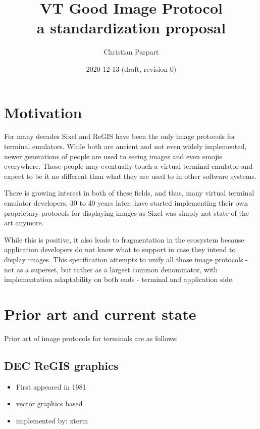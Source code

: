 \documentclass{article}
\title{VT Good Image Protocol \\
a standardization proposal}
\author{Christian Parpart}
\date{2020-12-13 (draft, revision 0)}
\begin{document}
\maketitle

\tableofcontents


\section{Motivation} %

For many decades Sixel and ReGIS have been the only image protocols for terminal emulators.
While both are ancient and not even widely implemented, newer generations of people are used
to seeing images and even emojis everywhere.
Those people may eventually touch a virtual terminal emulator and expect to be it no different
than what they are used to in other software systems.

There is growing interest in both of these fields, and thus, many virtual terminal emulator
developers, 30 to 40 years later, have started implementing their own proprietary protocols
for displaying images as Sixel was simply not state of the art anymore.

While this is positive, it also leads to fragmentation in the ecosystem because application
developers do not know what to support in case they intend to display images.
This specification attempts to unify all those image protocols - not as a superset, but rather
as a largest common denominator, with implementation adaptability on both ends - terminal and
application side.

\section{Prior art and current state} %

Prior art of image protocols for terminals are as follows:

\subsection{DEC ReGIS graphics}

\begin{itemize}
    \item First appeared in 1981
    \item vector graphics based
    \item implemented by: xterm
\end{itemize}
\end{document}
